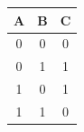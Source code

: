 \documentclass[12pt, a4paper]{report}
\begin{document}
\begin{enumerate}
{\begin{multicols}{3}
				\vfill \null    
				\columnbreak
				\begin{center}
					\begin{tabular}{c|c|c}
						A & B & C \\ \hline
						0 & 0 & 0 \\
						0 & 1 & 1 \\
						1 & 0 & 1 \\
						1 & 1 & 0 \\				
					\end{tabular}
				\end{center}
				\vfill \null    
				\columnbreak
				\begin{center}
					~\\
				\end{center}
				\vfill \null    
				\columnbreak
			\end{multicols}		
		}
	\end{enumerate}
	\newpage
\end{document}
